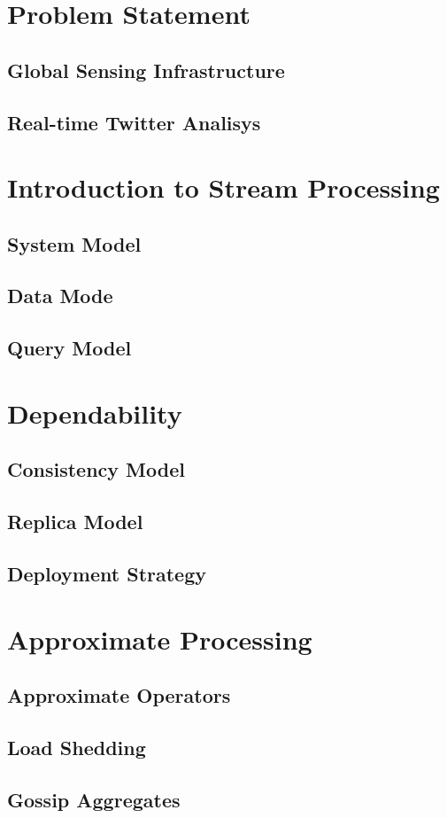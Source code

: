 
\section{Problem Statement}

	\subsection{Global Sensing Infrastructure}

	\subsection{Real-time Twitter Analisys}


\section{Introduction to Stream Processing}
	
	\subsection{System Model}

	\subsection{Data Mode}

	\subsection{Query Model}


\section{Dependability}

	\subsection{Consistency Model}

	\subsection{Replica Model}

	\subsection{Deployment Strategy}


\section{Approximate Processing}
	
	\subsection{Approximate Operators}

	\subsection{Load Shedding}

	\subsection{Gossip Aggregates}

